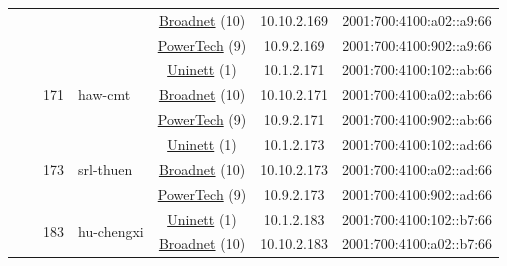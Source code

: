 \begin{small}
\begin{center}
\begin{longtable}{|c|c|c|c|c|c|c|c|}
  &  &  &  & \multicolumn{2}{|c|}{\tiny{\href{https://www.broadnet.no}{Broadnet} (10)}} & \tiny{10.10.2.169} & \tiny{2001:700:4100:a02::a9:66} \\* \cline{5-5}\cline{6-6}\cline{7-7}\cline{8-8}
  &  &  &  & \multicolumn{2}{|c|}{\tiny{\href{http://www.powertech.no}{PowerTech} (9)}} & \tiny{10.9.2.169} & \tiny{2001:700:4100:902::a9:66} \\* \cline{3-3}\cline{4-4}\cline{5-5}\cline{6-6}\cline{7-7}\cline{8-8}
  &  & \multirow{3}{*}{\tiny{171}} & \multicolumn{1}{|l|}{\multirow{3}{*}{\tiny{haw-cmt}}} & \multicolumn{2}{|c|}{\tiny{\href{https://www.uninett.no}{Uninett} (1)}} & \tiny{10.1.2.171} & \tiny{2001:700:4100:102::ab:66} \\* \cline{5-5}\cline{6-6}\cline{7-7}\cline{8-8}
  &  &  &  & \multicolumn{2}{|c|}{\tiny{\href{https://www.broadnet.no}{Broadnet} (10)}} & \tiny{10.10.2.171} & \tiny{2001:700:4100:a02::ab:66} \\* \cline{5-5}\cline{6-6}\cline{7-7}\cline{8-8}
  &  &  &  & \multicolumn{2}{|c|}{\tiny{\href{http://www.powertech.no}{PowerTech} (9)}} & \tiny{10.9.2.171} & \tiny{2001:700:4100:902::ab:66} \\* \cline{3-3}\cline{4-4}\cline{5-5}\cline{6-6}\cline{7-7}\cline{8-8}
  &  & \multirow{3}{*}{\tiny{173}} & \multicolumn{1}{|l|}{\multirow{3}{*}{\tiny{srl-thuen}}} & \multicolumn{2}{|c|}{\tiny{\href{https://www.uninett.no}{Uninett} (1)}} & \tiny{10.1.2.173} & \tiny{2001:700:4100:102::ad:66} \\* \cline{5-5}\cline{6-6}\cline{7-7}\cline{8-8}
  &  &  &  & \multicolumn{2}{|c|}{\tiny{\href{https://www.broadnet.no}{Broadnet} (10)}} & \tiny{10.10.2.173} & \tiny{2001:700:4100:a02::ad:66} \\* \cline{5-5}\cline{6-6}\cline{7-7}\cline{8-8}
  &  &  &  & \multicolumn{2}{|c|}{\tiny{\href{http://www.powertech.no}{PowerTech} (9)}} & \tiny{10.9.2.173} & \tiny{2001:700:4100:902::ad:66} \\* \cline{3-3}\cline{4-4}\cline{5-5}\cline{6-6}\cline{7-7}\cline{8-8}
  &  & \multirow{3}{*}{\tiny{183}} & \multicolumn{1}{|l|}{\multirow{3}{*}{\tiny{hu-chengxi}}} & \multicolumn{2}{|c|}{\tiny{\href{https://www.uninett.no}{Uninett} (1)}} & \tiny{10.1.2.183} & \tiny{2001:700:4100:102::b7:66} \\* \cline{5-5}\cline{6-6}\cline{7-7}\cline{8-8}
  &  &  &  & \multicolumn{2}{|c|}{\tiny{\href{https://www.broadnet.no}{Broadnet} (10)}} & \tiny{10.10.2.183} & \tiny{2001:700:4100:a02::b7:66} \\* \cline{5-5}\cline{6-6}\cline{7-7}\cline{8-8}

\end{longtable}
\end{center}
\end{small}
